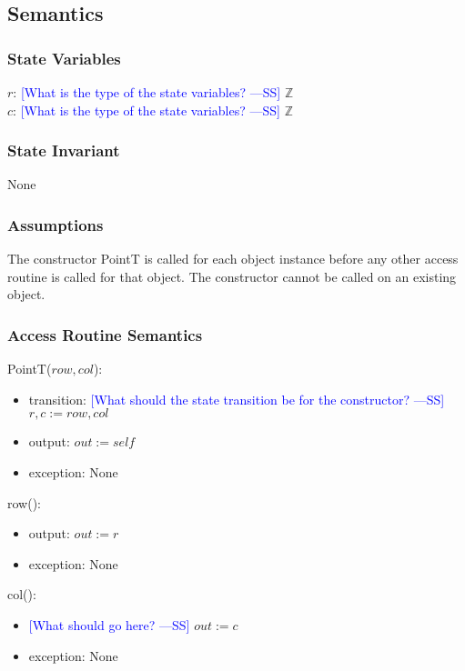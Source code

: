 \documentclass[12pt]{article}
\newcommand{\authornote}[3]{\textcolor{#1}{[#3 ---#2]}}
\newcommand{\authornote}[3]{}
\newcommand{\wss}[1]{\authornote{blue}{SS}{#1}}
\begin{document}
\subsection* {Semantics}

\subsubsection* {State Variables}

$r$: \wss{What is the type of the state variables?} $\mathbb{Z}$\\
$c$: \wss{What is the type of the state variables?} $\mathbb{Z}$

\subsubsection* {State Invariant}

None

\subsubsection* {Assumptions}

The constructor PointT is called for each object instance before any other
access routine is called for that object.  The constructor cannot be called on
an existing object.

\subsubsection* {Access Routine Semantics}

PointT($row, col$):
\begin{itemize}
\item transition: \wss{What should the state transition be for the constructor?} \\$r, c := row, col$
\item output: $out := \mathit{self}$
\item exception: None
\end{itemize}

\noindent row():
\begin{itemize}
\item output: $out := r$
\item exception: None
\end{itemize}

\noindent col():
\begin{itemize}
\item \wss{What should go here?} $out := c$
\item exception: None
\end{itemize}
\end{document}
